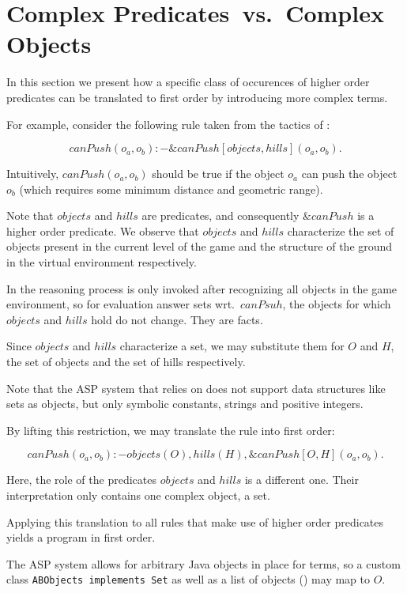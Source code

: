 \section{Complex Predicates~vs.~Complex Objects}
\label{sec:main}

In this section we present how a specific class of occurences of higher order predicates can be translated to first order by introducing more complex terms.

For example, consider the following rule taken from the tactics of \ah:


$$ canPush(o_a,o_b) :- \&canPush[objects,hills](o_a,o_b). $$

Intuitively, $canPush(o_a, o_b)$ should be true if the object $o_a$ can push the object $o_b$ (which requires some minimum distance and geometric range).

Note that $objects$ and $hills$ are predicates, and consequently $\&canPush$ is a higher order predicate. We observe that $objects$ and $hills$ characterize the set of objects present in the current level of the game and the structure of the ground in the virtual environment respectively.

In \ah the reasoning process is only invoked after recognizing all objects in the game environment, so for evaluation answer sets wrt.~$canPsuh$, the objects for which $objects$ and $hills$ hold do not change. They are facts.

Since $objects$ and $hills$ characterize a set, we may substitute them for $O$ and $H$, the set of objects and the set of hills respectively.

Note that the ASP system that \ah relies on does not support data structures like sets as objects, but only symbolic constants, strings and positive integers.

By lifting this restriction, we may translate the rule into first order:

$$ canPush(o_a,o_b) :- objects(O), hills(H), \&canPush[O,H](o_a,o_b). $$

Here, the role of the predicates $objects$ and $hills$ is a different one. Their interpretation only contains one complex object, a set.

Applying this translation to all rules that make use of higher order predicates yields a program in first order.

The ASP system \al allows for arbitrary Java objects in place for terms, so a custom class \texttt{ABObjects implements Set} as well as a list of objects () may map to $O$.


